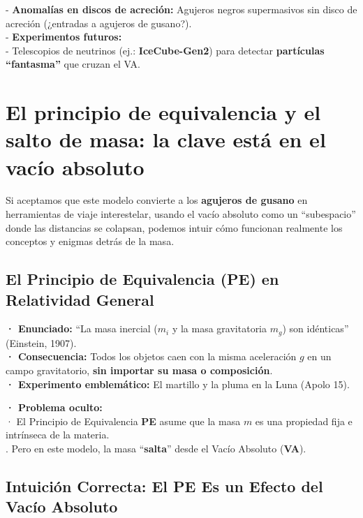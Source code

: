 \documentclass[a4paper]{article}
\theoremstyle{definition}
\theoremstyle{remark}
\numberwithin{equation}{section}
\begin{document}
	- \textbf{Anomalías en discos de acreción:} Agujeros negros supermasivos sin disco de acreción (¿entradas a agujeros de gusano?).\\
	
	- \textbf{Experimentos futuros:}\\
	
	- Telescopios de neutrinos (ej.: \textbf{IceCube-Gen2}) para detectar \textbf{partículas ``fantasma''} que cruzan el VA.
	
	
	\section{El principio de equivalencia y el salto de masa: la clave está en el vacío absoluto}
	
	Si aceptamos que este modelo convierte a los \textbf{agujeros de gusano} en herramientas de viaje interestelar, usando el vacío absoluto como un ``subespacio'' donde las distancias se colapsan, podemos intuir cómo funcionan realmente los conceptos y enigmas detrás de la masa.
	
	
	\subsection{El Principio de Equivalencia (PE) en Relatividad General}
	
	\textbf{· Enunciado:} ``La masa inercial (\(m_i\) y la masa gravitatoria \(m_g\)) son idénticas'' (Einstein, 1907).\\
	
	\textbf{· Consecuencia:} Todos los objetos caen con la misma aceleración \(g\) en un campo gravitatorio, \textbf{sin importar su masa o composición}.\\
	
	\textbf{· Experimento emblemático:} El martillo y la pluma en la Luna (Apolo 15).
	
	\textbf{· Problema oculto:}\\
	
	· El Principio de Equivalencia \textbf{PE} asume que la masa \(m\) es una propiedad fija e intrínseca de la materia.\\
	
	. Pero en este modelo, la masa ``\textbf{salta}'' desde el Vacío Absoluto (\textbf{VA}).
	
	\subsection{Intuición Correcta: El PE Es un Efecto del Vacío Absoluto}
	
\end{document}
